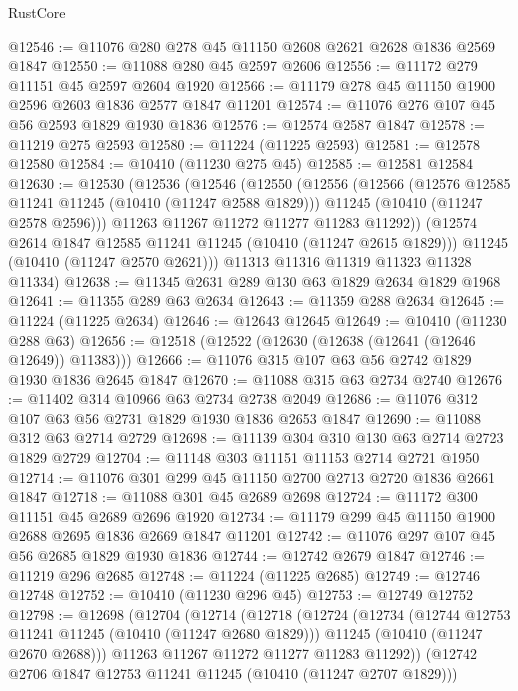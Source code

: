 \begin{lexlean}{RustCore}
\begin{coremodule}
@12546 := @11076 @280 @278 @45 @11150 @2608 @2621 @2628 @1836 @2569 @1847
@12550 := @11088 @280 @45 @2597 @2606
@12556 := @11172 @279 @11151 @45 @2597 @2604 @1920
@12566 := @11179 @278 @45 @11150 @1900 @2596 @2603 @1836 @2577 @1847 @11201
@12574 := @11076 @276 @107 @45 @56 @2593 @1829 @1930 @1836
@12576 := @12574 @2587 @1847
@12578 := @11219 @275 @2593
@12580 := @11224 (@11225 @2593)
@12581 := @12578 @12580
@12584 := @10410 (@11230 @275 @45)
@12585 := @12581 @12584
@12630 := @12530
    (@12536
      (@12546
        (@12550
          (@12556
            (@12566
              (@12576 @12585 @11241 @11245 (@10410 (@11247 @2588 @1829)))
              @11245
              (@10410 (@11247 @2578 @2596)))
            @11263
            @11267
            @11272
            @11277
            @11283
            @11292))
        (@12574 @2614 @1847 @12585 @11241 @11245 (@10410 (@11247 @2615 @1829)))
        @11245
        (@10410 (@11247 @2570 @2621)))
      @11313
      @11316
      @11319
      @11323
      @11328
      @11334)
@12638 := @11345 @2631 @289 @130 @63 @1829 @2634 @1829 @1968
@12641 := @11355 @289 @63 @2634
@12643 := @11359 @288 @2634
@12645 := @11224 (@11225 @2634)
@12646 := @12643 @12645
@12649 := @10410 (@11230 @288 @63)
@12656 := @12518 (@12522 (@12630 (@12638 (@12641 (@12646 @12649)) @11383)))
@12666 := @11076 @315 @107 @63 @56 @2742 @1829 @1930 @1836 @2645 @1847
@12670 := @11088 @315 @63 @2734 @2740
@12676 := @11402 @314 @10966 @63 @2734 @2738 @2049
@12686 := @11076 @312 @107 @63 @56 @2731 @1829 @1930 @1836 @2653 @1847
@12690 := @11088 @312 @63 @2714 @2729
@12698 := @11139 @304 @310 @130 @63 @2714 @2723 @1829 @2729
@12704 := @11148 @303 @11151 @11153 @2714 @2721 @1950
@12714 := @11076 @301 @299 @45 @11150 @2700 @2713 @2720 @1836 @2661 @1847
@12718 := @11088 @301 @45 @2689 @2698
@12724 := @11172 @300 @11151 @45 @2689 @2696 @1920
@12734 := @11179 @299 @45 @11150 @1900 @2688 @2695 @1836 @2669 @1847 @11201
@12742 := @11076 @297 @107 @45 @56 @2685 @1829 @1930 @1836
@12744 := @12742 @2679 @1847
@12746 := @11219 @296 @2685
@12748 := @11224 (@11225 @2685)
@12749 := @12746 @12748
@12752 := @10410 (@11230 @296 @45)
@12753 := @12749 @12752
@12798 := @12698
    (@12704
      (@12714
        (@12718
          (@12724
            (@12734
              (@12744 @12753 @11241 @11245 (@10410 (@11247 @2680 @1829)))
              @11245
              (@10410 (@11247 @2670 @2688)))
            @11263
            @11267
            @11272
            @11277
            @11283
            @11292))
        (@12742 @2706 @1847 @12753 @11241 @11245 (@10410 (@11247 @2707 @1829)))

\end{coremodule}
\end{lexlean}
